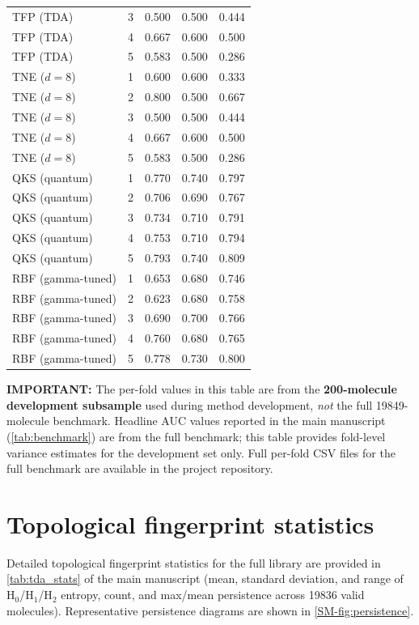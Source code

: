 \documentclass[11pt,a4paper]{article}
\begin{document}
\begin{table}[htbp]
\begin{tabularx}{\textwidth}{l l S[table-format=1.3] S[table-format=1.3] S[table-format=1.3]}
TFP (TDA) & 3 & 0.500 & 0.500 & 0.444 \\
TFP (TDA) & 4 & 0.667 & 0.600 & 0.500 \\
TFP (TDA) & 5 & 0.583 & 0.500 & 0.286 \\
\midrule
TNE ($d=8$) & 1 & 0.600 & 0.600 & 0.333 \\
TNE ($d=8$) & 2 & 0.800 & 0.500 & 0.667 \\
TNE ($d=8$) & 3 & 0.500 & 0.500 & 0.444 \\
TNE ($d=8$) & 4 & 0.667 & 0.600 & 0.500 \\
TNE ($d=8$) & 5 & 0.583 & 0.500 & 0.286 \\
\midrule
QKS (quantum) & 1 & 0.770 & 0.740 & 0.797 \\
QKS (quantum) & 2 & 0.706 & 0.690 & 0.767 \\
QKS (quantum) & 3 & 0.734 & 0.710 & 0.791 \\
QKS (quantum) & 4 & 0.753 & 0.710 & 0.794 \\
QKS (quantum) & 5 & 0.793 & 0.740 & 0.809 \\
\midrule
RBF (gamma-tuned) & 1 & 0.653 & 0.680 & 0.746 \\
RBF (gamma-tuned) & 2 & 0.623 & 0.680 & 0.758 \\
RBF (gamma-tuned) & 3 & 0.690 & 0.700 & 0.766 \\
RBF (gamma-tuned) & 4 & 0.760 & 0.680 & 0.765 \\
RBF (gamma-tuned) & 5 & 0.778 & 0.730 & 0.800 \\
\bottomrule
\end{tabularx}
\end{table}

\vspace{2mm}
\noindent\textbf{IMPORTANT:} The per-fold values in this table are from the \textbf{200-molecule development subsample} used during method development, \emph{not} the full \num{19849}-molecule benchmark. Headline AUC values reported in the main manuscript (\cref{tab:benchmark}) are from the full benchmark; this table provides fold-level variance estimates for the development set only. Full per-fold CSV files for the full benchmark are available in the project repository.

\section{Topological fingerprint statistics}



Detailed topological fingerprint statistics for the full library are provided in \cref{tab:tda_stats} of the main manuscript (mean, standard deviation, and range of H$_0$/H$_1$/H$_2$ entropy, count, and max/mean persistence across \num{19836} valid molecules). Representative persistence diagrams are shown in \cref{SM-fig:persistence}.
\end{document}
